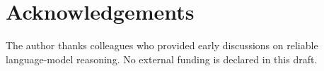 \section*{Acknowledgements}
The author thanks colleagues who provided early discussions on reliable language-model reasoning. No external funding is declared in this draft.
